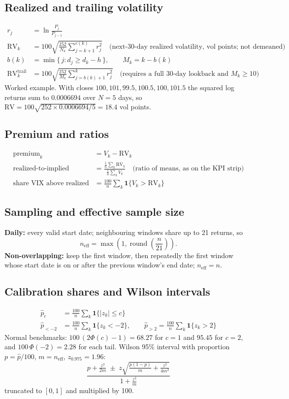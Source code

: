 \documentclass[11pt]{article}
\begin{document}
\subsection*{Realized and trailing volatility}
\begin{align*}
r_j &= \ln\frac{P_j}{P_{j-1}}\\
\mathrm{RV}_k &= 100\sqrt{\frac{252}{N_k}\sum_{j=k+1}^{e(k)} r_j^{2}} \quad \text{(next-30-day realized volatility, vol points; not demeaned)}\\
b(k) &= \min\{\, j : d_j \ge d_k - h \,\}, \qquad M_k = k - b(k)\\
\mathrm{RV}^{\mathrm{trail}}_k &= 100\sqrt{\frac{252}{M_k}\sum_{j=b(k)+1}^{k} r_j^{2}} \quad \text{(requires a full 30-day lookback and } M_k \ge 10\text{)}
\end{align*}
Worked example. With closes $100, 101, 99.5, 100.5, 100, 101.5$ the squared log returns sum to $0.0006694$ over $N=5$ days, so
$\mathrm{RV} = 100\sqrt{252 \times 0.0006694/5} = 18.4$ vol points.

\subsection*{Premium and ratios}
\begin{align*}
\text{premium}_k &= V_k - \mathrm{RV}_k\\
\text{realized-to-implied} &= \frac{\tfrac1n\sum_k \mathrm{RV}_k}{\tfrac1n\sum_k V_k} \quad \text{(ratio of means, as on the KPI strip)}\\
\text{share VIX above realized} &= \frac{100}{n}\sum_k \mathbf{1}\{V_k > \mathrm{RV}_k\}
\end{align*}

\subsection*{Sampling and effective sample size}
\noindent \textbf{Daily:} every valid start date; neighbouring windows share up to 21 returns, so
\[
n_{\mathrm{eff}} = \max\!\left(1, \operatorname{round}\!\left(\frac{n}{21}\right)\right).
\]
\textbf{Non-overlapping:} keep the first window, then repeatedly the first window whose start date is on or after the previous window's end date; $n_{\mathrm{eff}} = n$.

\subsection*{Calibration shares and Wilson intervals}
\begin{align*}
\hat p_c &= \frac{100}{n}\sum_k \mathbf{1}\{|z_k| \le c\}\\
\hat p_{<-2} &= \frac{100}{n}\sum_k \mathbf{1}\{z_k < -2\}, \qquad
\hat p_{>2} = \frac{100}{n}\sum_k \mathbf{1}\{z_k > 2\}
\end{align*}
Normal benchmarks: $100\,(2\Phi(c) - 1) = 68.27$ for $c=1$ and $95.45$ for $c=2$, and $100\,\Phi(-2) = 2.28$ for each tail.
Wilson 95\% interval with proportion $p = \hat p/100$, $m = n_{\mathrm{eff}}$, $z_{0.975} = 1.96$:
\[
\frac{p + \frac{z^2}{2m} \;\pm\; z\sqrt{\frac{p(1-p)}{m} + \frac{z^2}{4m^2}}}{1 + \frac{z^2}{m}}
\]
truncated to $[0, 1]$ and multiplied by 100.
\end{document}
